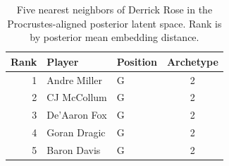 \begin{table}[htbp]
  \centering\small
  \begin{tabular}{rllc}
    \toprule
    Rank & Player & Position & Archetype \\
    \midrule
    1 & Andre Miller & G & 2 \\
    2 & CJ McCollum & G & 2 \\
    3 & De'Aaron Fox & G & 2 \\
    4 & Goran Dragic & G & 2 \\
    5 & Baron Davis & G & 2 \\
    \bottomrule
  \end{tabular}
  \caption{Five nearest neighbors of Derrick Rose in the Procrustes-aligned posterior latent space. Rank is by posterior mean embedding distance.}
  \label{tab:Derrick_Rose_neighbors}
\end{table}

